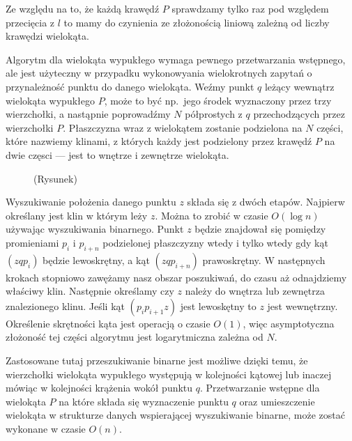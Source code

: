 Ze względu na to, że każdą krawędź $P$ sprawdzamy tylko raz pod względem
przecięcia z $l$ to mamy do czynienia ze złożonością liniową zależną od
liczby krawędzi wielokąta.

Algorytm dla wielokąta wypukłego wymaga pewnego przetwarzania
wstępnego, ale jest użyteczny w przypadku wykonowyania wielokrotnych
zapytań o przynależność punktu do danego wielokąta. Weźmy punkt $q$
leżący wewnątrz wielokąta wypukłego $P$, może to być np.\ jego środek
wyznaczony przez trzy wierzchołki, a nastąpnie poprowadźmy $N$
półprostych z $q$ przechodzących przez wierzchołki $P$. Płaszczyzna
wraz z wielokątem zostanie podzielona na $N$ części, które nazwiemy
klinami, z których każdy jest podzielony przez krawędź $P$ na dwie
częsci --- jest to wnętrze i zewnętrze wielokąta.

\begin{figure}[htp]
  \centering
  \caption{(Rysunek)}
\end{figure}

Wyszukiwanie położenia danego punktu $z$ składa się z dwóch
etapów. Najpierw określany jest klin w którym leży $z$. Można to
zrobić w czasie $O(\log n)$ używając wyszukiwania binarnego. Punkt $z$
będzie znajdował się pomiędzy promieniami $p_i$ i $p_{i+n}$
podzielonej płaszczyzny wtedy i tylko wtedy gdy kąt $(zqp_i)$ będzie
lewoskrętny, a kąt $(zqp_{i+n})$ prawoskrętny. W następnych krokach
stopniowo zawężamy nasz obszar poszukiwań, do czasu aż odnajdziemy
właściwy klin. Następnie określamy czy $z$ należy do wnętrza lub
zewnętrza znalezionego klinu. Jeśli kąt $(p_{i}p_{i+1}z)$ jest
lewoskętny to $z$ jest wewnętrzny. Określenie skrętności kąta jest
operacją o czasie $O(1)$, więc asymptotyczna złożoność tej części
algorytmu jest logarytmiczna zależna od $N$.

Zastosowane tutaj przeszukiwanie binarne jest możliwe dzięki temu, że
wierzchołki wielokąta wypukłego występują w kolejności kątowej lub
inaczej mówiąc w kolejności krążenia wokół punktu $q$. Przetwarzanie
wstępne dla wielokąta $P$ na które składa się wyznaczenie punktu $q$
oraz umieszczenie wielokąta w strukturze danych wspierającej
wyszukiwanie binarne, może zostać wykonane w czasie $O(n)$.

